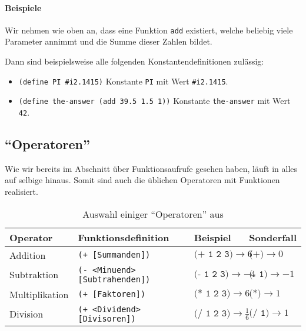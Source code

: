 	\paragraph{Beispiele}
		Wir nehmen wie oben an, dass eine Funktion \texttt{add} existiert, welche beliebig viele Parameter annimmt und die Summe dieser Zahlen bildet.
		
		Dann sind beispielsweise alle folgenden Konstantendefinitionen zulässig:
		\begin{itemize}
			\item \lstinline[language = Racket]|(define PI #i2.1415)| 				  \tabto{7.5cm} Konstante \texttt{PI} mit Wert \texttt{\#i2.1415}.
			\item \lstinline[language = Racket]|(define the-answer (add 39.5 1.5 1))| \tabto{7.5cm} Konstante \texttt{the-answer} mit Wert \texttt{42}.
		\end{itemize}

\subsection{\enquote{Operatoren}}

	Wie wir bereits im Abschnitt über Funktionsaufrufe gesehen haben, läuft in \racketText alles auf selbige hinaus. Somit sind auch die üblichen Operatoren mit Funktionen realisiert.

	\begin{table}[H]
		\centering
		\begin{tabular}{l l l l}
			\textbf{Operator} & \textbf{Funktionsdefinition}          & \textbf{Beispiel}                                & \textbf{Sonderfall}                 \\ \hline
			Addition          & \texttt{(+ [Summanden])}              & \( \texttt{(+ 1 2 3)} \rightarrow 6 \)           & \( \texttt{(+)} \rightarrow 0 \)    \\
			Subtraktion       & \texttt{(- <Minuend> [Subtrahenden])} & \( \texttt{(- 1 2 3)} \rightarrow -4 \)          & \( \texttt{(- 1)} \rightarrow -1 \) \\
			Multiplikation    & \texttt{(+ [Faktoren])}               & \( \texttt{(* 1 2 3)} \rightarrow 6 \)           & \( \texttt{(*)} \rightarrow 1 \)    \\
			Division          & \texttt{(+ <Dividend> [Divisoren])}   & \( \texttt{(/ 1 2 3)} \rightarrow \frac{1}{6} \) & \( \texttt{(/ 1)} \rightarrow 1 \)
		\end{tabular}
		\caption{Auswahl einiger \enquote{Operatoren} aus \racket}
	\end{table}

